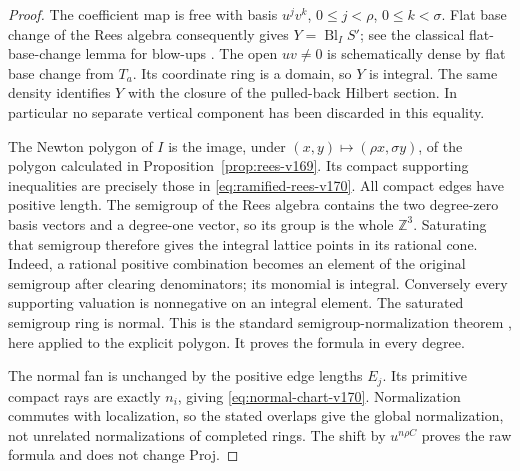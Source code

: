 \documentclass[11pt,reqno]{amsart}
\numberwithin{equation}{section}
\theoremstyle{definition}\newtheorem{definition}[theorem]{Definition}
\theoremstyle{remark}\newtheorem{remark}[theorem]{Remark}
\begin{document}
\begin{proof}
The coefficient map is free with basis $u^jv^k$, $0\leq j<\rho$,
$0\leq k<\sigma$. Flat base change of the Rees algebra consequently
gives $Y=\operatorname{Bl}_I S'$; see the classical flat-base-change
lemma for blow-ups \cite{Stacks169}. The open $uv\ne0$ is
schematically dense by flat base change from $T_a$. Its coordinate
ring is a domain, so $Y$ is integral. The same density identifies
$Y$ with the closure of the pulled-back Hilbert section. In particular
no separate vertical component has been discarded in this equality.

The Newton polygon of $I$ is the image, under
$(x,y)\mapsto(\rho x,\sigma y)$, of the polygon calculated in
Proposition~\ref{prop:rees-v169}. Its compact supporting inequalities
are precisely those in \eqref{eq:ramified-rees-v170}. All compact
edges have positive length. The semigroup of the Rees algebra
contains the two degree-zero basis vectors and a degree-one vector,
so its group is the whole $\mathbb Z^3$. Saturating that semigroup
therefore gives the integral lattice points in its rational cone.
Indeed, a rational positive combination becomes an element of the
original semigroup after clearing denominators; its monomial is
integral. Conversely every supporting valuation is nonnegative on
an integral element. The saturated semigroup ring is normal. This
is the standard semigroup-normalization theorem
\cite[Proposition~5 and Section~2.6]{GonzalezTeissier170}, here applied
to the explicit polygon. It proves the formula in every degree.

The normal fan is unchanged by the positive edge lengths $E_j$.
Its primitive compact rays are exactly $n_i$, giving
\eqref{eq:normal-chart-v170}. Normalization commutes with localization,
so the stated overlaps give the global normalization, not unrelated
normalizations of completed rings. The shift by $u^{n\rho C}$ proves
the raw formula and does not change Proj.
\end{proof}
\end{document}
